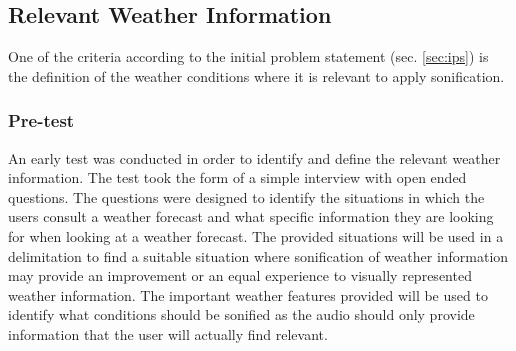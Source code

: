 \subsection{Relevant Weather Information} \label{sec:relevantweatherinformation}
One of the criteria according to the initial problem statement (sec. \ref{sec:ips}) is the definition of the weather conditions where it is relevant to apply sonification.

\subsubsection{Pre-test} \label{sec:pretest} 
An early test was conducted in order to identify and define the relevant weather information. 
The test took the form of a simple interview with open ended questions.
The questions were designed to identify the situations in which the users consult a weather forecast and what specific information they are looking for when looking at a weather forecast.
The provided situations will be used in a delimitation to find a suitable situation where sonification of weather information may provide an improvement or an equal experience to visually represented weather information.
The important weather features provided will be used to identify what conditions should be sonified as the audio should only provide information that the user will actually find relevant.